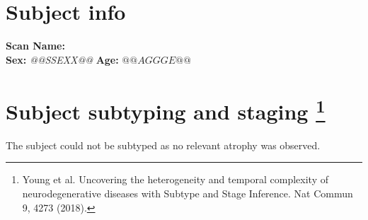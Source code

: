 \documentclass[12pt,oneside]{article}
\begin{document}
\noindent
\pagestyle{empty}
\vspace{-1.5cm}


\section*{Subject info}
\noindent
\textbf{Scan Name:} \textit{} \\
\textbf{Sex:} \textit{@@SSEXX@@} \qquad \textbf{Age:} $@@AGGGE@@$\\


\section*{Subject subtyping and staging \footnote{{Young et al. Uncovering the heterogeneity and temporal complexity of neurodegenerative diseases with Subtype and Stage Inference. Nat Commun 9, 4273 (2018).}}}
\noindent
The subject could not be subtyped as no relevant atrophy was observed.\\
\end{document}
